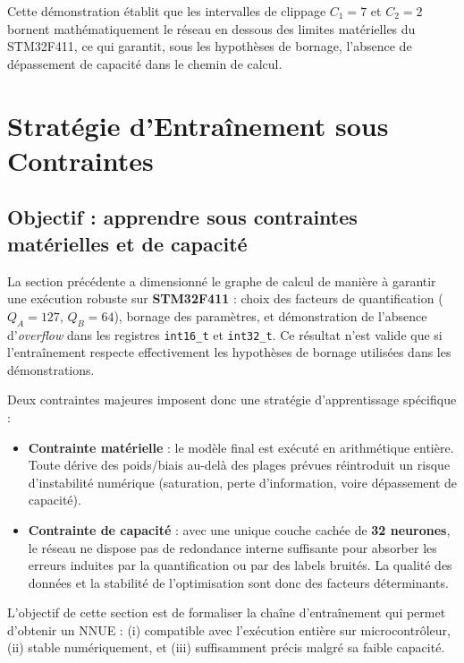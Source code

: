 \documentclass[11pt, a4paper]{article}
\begin{document}
Cette démonstration établit que les intervalles de clippage $C_1=7$ et $C_2=2$ bornent mathématiquement le réseau en dessous des limites matérielles du STM32F411, ce qui garantit, sous les hypothèses de bornage, l'absence de dépassement de capacité dans le chemin de calcul.


\section{Stratégie d'Entraînement sous Contraintes}

\subsection{Objectif : apprendre sous contraintes matérielles et de capacité}
La section précédente a dimensionné le graphe de calcul de manière à garantir une exécution robuste sur \textbf{STM32F411} : choix des facteurs de quantification ($Q_A=127$, $Q_B=64$), bornage des paramètres, et démonstration de l'absence d'\textit{overflow} dans les registres \texttt{int16\_t} et \texttt{int32\_t}. Ce résultat n'est valide que si l'entraînement respecte effectivement les hypothèses de bornage utilisées dans les démonstrations.

Deux contraintes majeures imposent donc une stratégie d'apprentissage spécifique :
\begin{itemize}
    \item \textbf{Contrainte matérielle} : le modèle final est exécuté en arithmétique entière. Toute dérive des poids/biais au-delà des plages prévues réintroduit un risque d'instabilité numérique (saturation, perte d'information, voire dépassement de capacité).
    \item \textbf{Contrainte de capacité} : avec une unique couche cachée de \textbf{32 neurones}, le réseau ne dispose pas de redondance interne suffisante pour absorber les erreurs induites par la quantification ou par des labels bruités. La qualité des données et la stabilité de l'optimisation sont donc des facteurs déterminants.
\end{itemize}

L'objectif de cette section est de formaliser la chaîne d'entraînement qui permet d'obtenir un NNUE :
(i) compatible avec l'exécution entière sur microcontrôleur, (ii) stable numériquement, et (iii) suffisamment précis malgré sa faible capacité.
\end{document}
